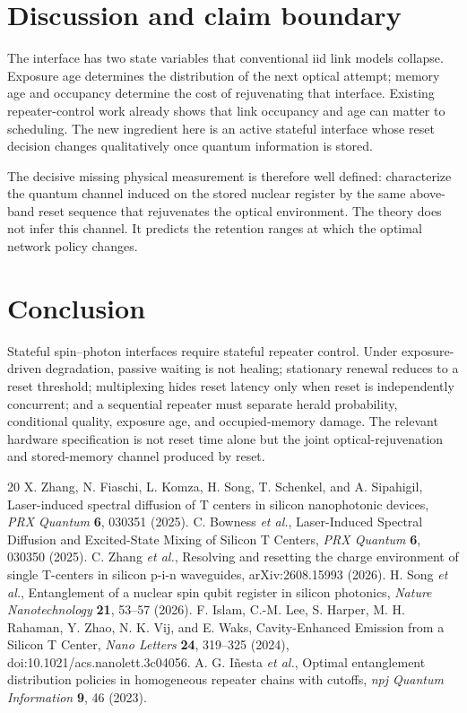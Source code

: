 \documentclass[aps,prx,reprint,superscriptaddress,nofootinbib,longbibliography,floatfix]{revtex4-2}
\begin{document}
\section{Discussion and claim boundary}
The interface has two state variables that conventional iid link models collapse. Exposure age determines the distribution of the next optical attempt; memory age and occupancy determine the cost of rejuvenating that interface. Existing repeater-control work already shows that link occupancy and age can matter to scheduling. The new ingredient here is an active stateful interface whose reset decision changes qualitatively once quantum information is stored.

The decisive missing physical measurement is therefore well defined: characterize the quantum channel induced on the stored nuclear register by the same above-band reset sequence that rejuvenates the optical environment. The theory does not infer this channel. It predicts the retention ranges at which the optimal network policy changes.

\section{Conclusion}
Stateful spin--photon interfaces require stateful repeater control. Under exposure-driven degradation, passive waiting is not healing; stationary renewal reduces to a reset threshold; multiplexing hides reset latency only when reset is independently concurrent; and a sequential repeater must separate herald probability, conditional quality, exposure age, and occupied-memory damage. The relevant hardware specification is not reset time alone but the joint optical-rejuvenation and stored-memory channel produced by reset.

\begin{thebibliography}{20}
 X. Zhang, N. Fiaschi, L. Komza, H. Song, T. Schenkel, and A. Sipahigil, Laser-induced spectral diffusion of T centers in silicon nanophotonic devices, \emph{PRX Quantum} \textbf{6}, 030351 (2025).
 C. Bowness \emph{et al.}, Laser-Induced Spectral Diffusion and Excited-State Mixing of Silicon T Centers, \emph{PRX Quantum} \textbf{6}, 030350 (2025).
 C. Zhang \emph{et al.}, Resolving and resetting the charge environment of single T-centers in silicon p-i-n waveguides, arXiv:2608.15993 (2026).
 H. Song \emph{et al.}, Entanglement of a nuclear spin qubit register in silicon photonics, \emph{Nature Nanotechnology} \textbf{21}, 53--57 (2026).
 F. Islam, C.-M. Lee, S. Harper, M. H. Rahaman, Y. Zhao, N. K. Vij, and E. Waks, Cavity-Enhanced Emission from a Silicon T Center, \emph{Nano Letters} \textbf{24}, 319--325 (2024), doi:10.1021/acs.nanolett.3c04056.
 A. G. I\~nesta \emph{et al.}, Optimal entanglement distribution policies in homogeneous repeater chains with cutoffs, \emph{npj Quantum Information} \textbf{9}, 46 (2023).
\end{thebibliography}
\end{document}
